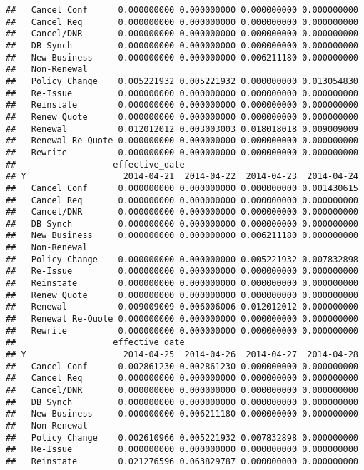 \documentclass[]{article}
\begin{document}
\begin{verbatim}
##   Cancel Conf      0.000000000 0.000000000 0.000000000 0.000000000
##   Cancel Req       0.000000000 0.000000000 0.000000000 0.000000000
##   Cancel/DNR       0.000000000 0.000000000 0.000000000 0.000000000
##   DB Synch         0.000000000 0.000000000 0.000000000 0.000000000
##   New Business     0.000000000 0.000000000 0.006211180 0.000000000
##   Non-Renewal                                                     
##   Policy Change    0.005221932 0.005221932 0.000000000 0.013054830
##   Re-Issue         0.000000000 0.000000000 0.000000000 0.000000000
##   Reinstate        0.000000000 0.000000000 0.000000000 0.000000000
##   Renew Quote      0.000000000 0.000000000 0.000000000 0.000000000
##   Renewal          0.012012012 0.003003003 0.018018018 0.009009009
##   Renewal Re-Quote 0.000000000 0.000000000 0.000000000 0.000000000
##   Rewrite          0.000000000 0.000000000 0.000000000 0.000000000
##                   effective_date
## Y                   2014-04-21  2014-04-22  2014-04-23  2014-04-24
##   Cancel Conf      0.000000000 0.000000000 0.000000000 0.001430615
##   Cancel Req       0.000000000 0.000000000 0.000000000 0.000000000
##   Cancel/DNR       0.000000000 0.000000000 0.000000000 0.000000000
##   DB Synch         0.000000000 0.000000000 0.000000000 0.000000000
##   New Business     0.000000000 0.000000000 0.006211180 0.000000000
##   Non-Renewal                                                     
##   Policy Change    0.000000000 0.000000000 0.005221932 0.007832898
##   Re-Issue         0.000000000 0.000000000 0.000000000 0.000000000
##   Reinstate        0.000000000 0.000000000 0.000000000 0.000000000
##   Renew Quote      0.000000000 0.000000000 0.000000000 0.000000000
##   Renewal          0.009009009 0.006006006 0.012012012 0.000000000
##   Renewal Re-Quote 0.000000000 0.000000000 0.000000000 0.000000000
##   Rewrite          0.000000000 0.000000000 0.000000000 0.000000000
##                   effective_date
## Y                   2014-04-25  2014-04-26  2014-04-27  2014-04-28
##   Cancel Conf      0.002861230 0.002861230 0.000000000 0.000000000
##   Cancel Req       0.000000000 0.000000000 0.000000000 0.000000000
##   Cancel/DNR       0.000000000 0.000000000 0.000000000 0.000000000
##   DB Synch         0.000000000 0.000000000 0.000000000 0.000000000
##   New Business     0.000000000 0.006211180 0.000000000 0.000000000
##   Non-Renewal                                                     
##   Policy Change    0.002610966 0.005221932 0.007832898 0.000000000
##   Re-Issue         0.000000000 0.000000000 0.000000000 0.000000000
##   Reinstate        0.021276596 0.063829787 0.000000000 0.000000000

\end{verbatim}
\end{document}
